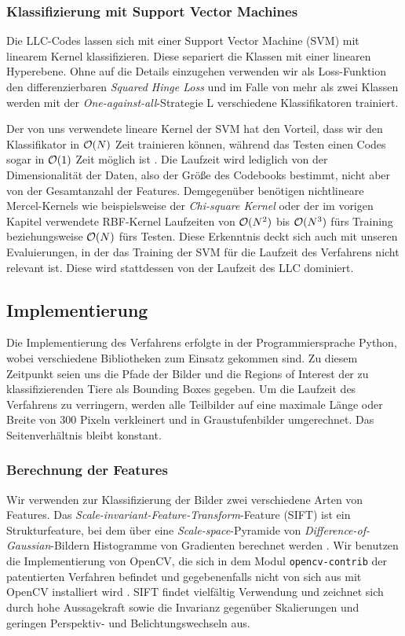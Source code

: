 \subsubsection{Klassifizierung mit Support Vector Machines}

Die LLC-Codes lassen sich mit einer Support Vector Machine (SVM) mit linearem Kernel klassifizieren. Diese separiert die Klassen mit einer linearen Hyperebene. Ohne auf die Details einzugehen verwenden wir als Loss-Funktion den differenzierbaren \emph{Squared Hinge Loss} und im Falle von mehr als zwei Klassen werden mit der \emph{One-against-all}-Strategie L verschiedene Klassifikatoren trainiert.

Der von uns verwendete lineare Kernel der SVM hat den Vorteil, dass wir den Klassifikator in $\mathcal{O}(N)$ Zeit trainieren können, während das Testen einen Codes sogar in $\mathcal{O}(1)$ Zeit möglich ist \cite{yygh09}. Die Laufzeit wird lediglich von der Dimensionalität der Daten, also der Größe des Codebooks bestimmt, nicht aber von der Gesamtanzahl der Features. Demgegenüber benötigen nichtlineare Mercel-Kernels wie beispielsweise der \emph{Chi-square Kernel} oder der im vorigen Kapitel verwendete RBF-Kernel Laufzeiten von $\mathcal{O}(N^2)$ bis $\mathcal{O}(N^3)$ fürs Training beziehungsweise $\mathcal{O}(N)$ fürs Testen. Diese Erkenntnis deckt sich auch mit unseren Evaluierungen, in der das Training der SVM für die Laufzeit des Verfahrens nicht relevant ist. Diese wird stattdessen von der Laufzeit des LLC dominiert.

\subsection{Implementierung}

Die Implementierung des Verfahrens erfolgte in der Programmiersprache Python, wobei verschiedene Bibliotheken zum Einsatz gekommen sind. Zu diesem Zeitpunkt seien uns die Pfade der Bilder und die Regions of Interest der zu klassifizierenden Tiere als Bounding Boxes gegeben. Um die Laufzeit des Verfahrens zu verringern, werden alle Teilbilder auf eine maximale Länge oder Breite von 300 Pixeln verkleinert und in Graustufenbilder umgerechnet. Das Seitenverhältnis bleibt konstant.

\subsubsection{Berechnung der Features}

Wir verwenden zur Klassifizierung der Bilder zwei verschiedene Arten von Features. Das \emph{Scale-invariant-Feature-Transform}-Feature (SIFT) ist ein Strukturfeature, bei dem über eine \emph{Scale-space}-Pyramide von \emph{Difference-of-Gaussian}-Bildern Histogramme von Gradienten berechnet werden \cite{lowe99}. Wir benutzen die Implementierung von OpenCV, die sich in dem Modul \texttt{opencv-contrib} der patentierten Verfahren befindet und gegebenenfalls nicht von sich aus mit OpenCV installiert wird \cite{ocv}. SIFT findet vielfältig Verwendung und zeichnet sich durch hohe Aussagekraft sowie die Invarianz gegenüber Skalierungen und geringen Perspektiv- und Belichtungswechseln aus.

